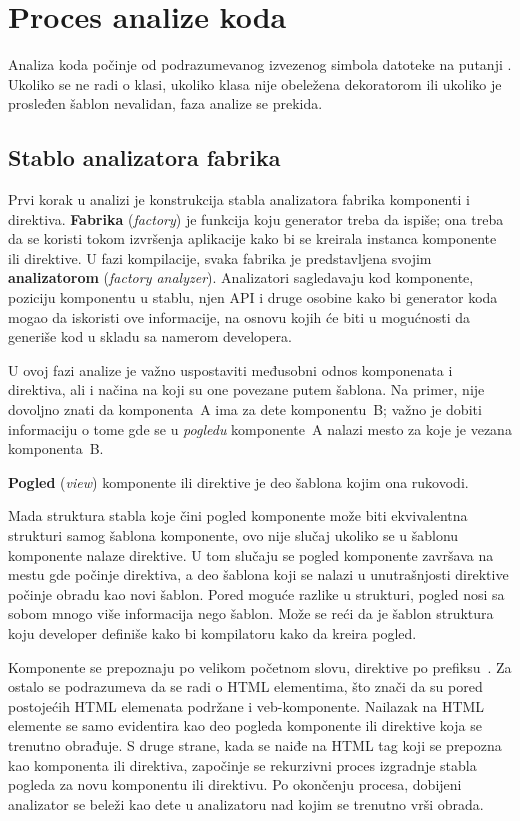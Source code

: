 \section{Proces analize koda}

Analiza koda počinje od podrazumevanog izvezenog simbola datoteke na putanji .
Ukoliko se ne radi o klasi, ukoliko klasa nije obeležena dekoratorom  ili ukoliko je prosleđen šablon nevalidan, faza analize se prekida.

\subsection{Stablo analizatora fabrika}

Prvi korak u analizi je konstrukcija stabla analizatora fabrika komponenti i direktiva.
\textbf{Fabrika} (\textsl{factory}) je funkcija koju generator treba da ispiše; ona treba da se koristi tokom izvršenja aplikacije kako bi se kreirala instanca komponente ili direktive.
U fazi kompilacije, svaka fabrika je predstavljena svojim \textbf{analizatorom} (\textsl{factory analyzer}).
Analizatori sagledavaju kod komponente, poziciju komponentu u stablu, njen API i druge osobine kako bi generator koda mogao da iskoristi ove informacije, na osnovu kojih će biti u mogućnosti da generiše kod u skladu sa namerom developera.

U ovoj fazi analize je važno uspostaviti međusobni odnos komponenata i direktiva, ali i načina na koji su one povezane putem šablona.
Na primer, nije dovoljno znati da komponenta~A ima za dete komponentu~B; važno je dobiti informaciju o tome gde se u \emph{pogledu} komponente~A nalazi mesto za koje je vezana komponenta~B.

\textbf{Pogled} (\textsl{view}) komponente ili direktive je deo šablona kojim ona rukovodi.

Mada struktura stabla koje čini pogled komponente može biti ekvivalentna strukturi samog šablona komponente, ovo nije slučaj ukoliko se u šablonu komponente nalaze direktive.
U tom slučaju se pogled komponente završava na mestu gde počinje direktiva, a deo šablona koji se nalazi u unutrašnjosti direktive počinje obradu kao novi šablon.
Pored moguće razlike u strukturi, pogled nosi sa sobom mnogo više informacija nego šablon.
Može se reći da je šablon struktura koju developer definiše kako bi  kompilatoru kako da kreira pogled.

Komponente se prepoznaju po velikom početnom slovu, direktive po prefiksu~.
Za ostalo se podrazumeva da se radi o HTML elementima, što znači da su pored postojećih HTML elemenata podržane i veb-komponente.
Nailazak na HTML elemente se samo evidentira kao deo pogleda komponente ili direktive koja se trenutno obrađuje.
S druge strane, kada se naiđe na HTML tag koji se prepozna kao komponenta ili direktiva, započinje se rekurzivni proces izgradnje stabla pogleda za novu komponentu ili direktivu.
Po okončenju procesa, dobijeni analizator se beleži kao dete u analizatoru nad kojim se trenutno vrši obrada.

